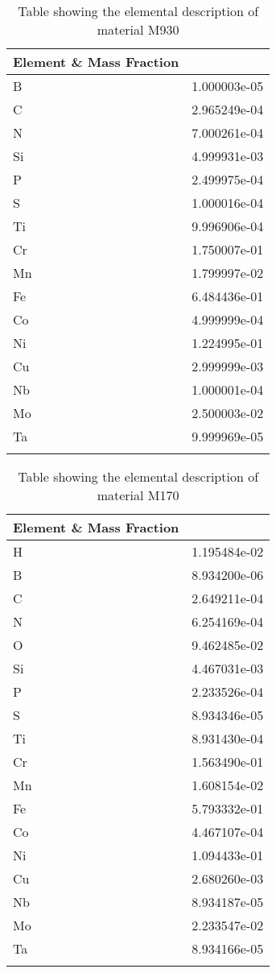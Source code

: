 \begin{centering}
\begin{longtable}[ht!]
  { p{} | p{} }
\hline
Element \& Mass Fraction\\
\hline
B &  1.000003e-05\\
C &  2.965249e-04\\
N &  7.000261e-04\\
Si &  4.999931e-03\\
P &  2.499975e-04\\
S &  1.000016e-04\\
Ti &  9.996906e-04\\
Cr &  1.750007e-01\\
Mn &  1.799997e-02\\
Fe &  6.484436e-01\\
Co &  4.999999e-04\\
Ni &  1.224995e-01\\
Cu &  2.999999e-03\\
Nb &  1.000001e-04\\
Mo &  2.500003e-02\\
Ta &  9.999969e-05\\
\caption{Table showing the elemental description of material M930}
\label{table:material_UPPFW}
\end{longtable}
\clearpage

\begin{longtable}[ht!]
{ p{} | p{} }
\hline
Element \& Mass Fraction\\
\hline
H &  1.195484e-02\\
B &  8.934200e-06\\
C &  2.649211e-04\\
N &  6.254169e-04\\
O &  9.462485e-02\\
Si &  4.467031e-03\\
P &  2.233526e-04\\
S &  8.934346e-05\\
Ti &  8.931430e-04\\
Cr &  1.563490e-01\\
Mn &  1.608154e-02\\
Fe &  5.793332e-01\\
Co &  4.467107e-04\\
Ni &  1.094433e-01\\
Cu &  2.680260e-03\\
Nb &  8.934187e-05\\
Mo &  2.233547e-02\\
Ta &  8.934166e-05\\
\caption{Table showing the elemental description of material M170}
\label{table:material_M170}
\end{longtable}
\clearpage


\end{centering}
